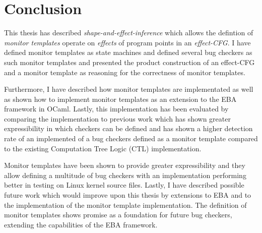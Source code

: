 \section{Conclusion}

This thesis has described \textit{shape-and-effect-inference} which allows the defintion of \textit{monitor templates} operate on \textit{effects} of program points in an \textit{effect-CFG}. I have defined monitor templates as state machines and defined several bug checkers as such monitor templates and presented the product construction of an effect-CFG and a monitor template as reasoning for the correctness of monitor templates. 

\newpar Furthermore, I have described how monitor templates are implementated as well as shown how to implement monitor templates as an extension to the EBA framework in OCaml. Lastly, this implementation has been evaluated by comparing the implementation to previous work which has shown greater expressibility in which checkers can be defined and has shown a higher detection rate of an implemented of a bug checkers defined as a monitor template compared to the existing Computation Tree Logic (CTL) implementation. 

\newpar Monitor templates have been shown to provide greater expressibility and they allow defining a multitude of bug checkers with an implementation performing better in testing on Linux kernel source files. Lastly, I have described possible future work which would improve upon this thesis by extensions to EBA and to the implementation of the monitor template implementation. The definition of monitor templates shows promise as a foundation for future bug checkers, extending the capabilities of the EBA framework. 